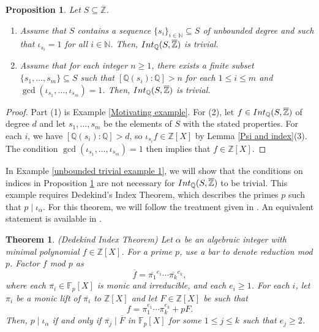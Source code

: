 \documentclass{article}
\newtheorem{Prop}[equation]{Proposition}
\newtheorem{Thm}[equation]{Theorem}
\theoremstyle{definition}\newtheorem{Def}[equation]{Definition}
\theoremstyle{definition}\newtheorem{Ques}[equation]{Question}
\theoremstyle{definition}\newtheorem{Conj}[equation]{Conjecture}
\theoremstyle{definition}\newtheorem{Not}[equation]{Notation}
\newcommand{\N}{\mathbb{N}}
\newcommand{\Q}{\mathbb{Q}}
\newcommand{\F}{\mathbb{F}}
\newcommand{\oZ}{\overline{\Z}}
\newcommand{\Z}{\mathbb{Z}}
\newcommand{\Int}{\textnormal{Int}}
\newcommand{\IntQ}{\Int_{\Q}}
\numberwithin{equation}{section}
\begin{document}
\begin{Prop}\label{index trivial conditions}
Let $S \subseteq \oZ$.
\begin{enumerate}[(1)]%
\item Assume that $S$ contains a sequence $\{s_i\}_{i \in \N} \subseteq S$ of unbounded degree and such that $\iota_{s_i}=1$ for all $i \in \N$. Then, $\IntQ(S,\oZ)$ is trivial.

\item Assume that for each integer $n \geq 1$, there exists a finite subset $\{s_1, \ldots, s_m\} \subseteq S$ such that $[\Q(s_i):\Q] > n$ for each $1 \leq i \leq m$ and $\gcd(\iota_{s_1}, \ldots, \iota_{s_m})=1$. Then, $\IntQ(S,\oZ)$ is trivial.
\end{enumerate}
\end{Prop}
\begin{proof}
Part (1) is Example \ref{Motivating example}. For (2), let $f \in \IntQ(S, \oZ)$ of degree $d$ and let $s_1, \ldots, s_m$ be the elements of $S$ with the stated properties. For each $i$, we have $[\Q(s_i):\Q] > d$, so $\iota_{s_i}f \in \Z[X]$ by Lemma \ref{Psi and index}(3). The condition $\gcd(\iota_{s_1}, \ldots, \iota_{s_m}) = 1$ then implies that $f \in \Z[X]$.
\end{proof}


 In Example \ref{unbounded trivial example 1}, we will show that the conditions on indices in Proposition \ref{index trivial conditions} are not necessary for $\IntQ(S,\oZ)$ to be trivial. This example requires Dedekind's Index Theorem, which describes the primes $p$ such that $p \mid \iota_\alpha$. For this theorem, we will follow the treatment given in \cite{Conrad}. An equivalent statement is available in \cite[Theorem 6.1.4]{Cohen}.

\begin{Thm}\label{Dedekind index theorem}(Dedekind Index Theorem)
Let $\alpha$ be an algebraic integer with minimal polynomial $f \in \Z[X]$. For a prime $p$, use a bar to denote reduction mod $p$. Factor $f$ mod $p$ as
\begin{equation*}
\overline{f} = \overline{\pi_1}^{e_1} \cdots \overline{\pi_k}^{e_k},
\end{equation*}
where each $\overline{\pi_i} \in \F_p[X]$ is monic and irreducible, and each $e_i \geq 1$. For each $i$, let $\pi_i$ be a monic lift of $\overline{\pi_i}$ to $\Z[X]$ and let $F \in \Z[X]$ be such that
\begin{equation*}
f = \pi_1^{e_1} \cdots \pi_k^{e_k} + pF.
\end{equation*}
Then, $p \mid \iota_\alpha$ if and only if $\overline{\pi_j} \mid \overline{F}$ in $\F_p[X]$ for some $1 \leq j \leq k$ such that $e_j \geq 2$.
\end{Thm}
\end{document}

